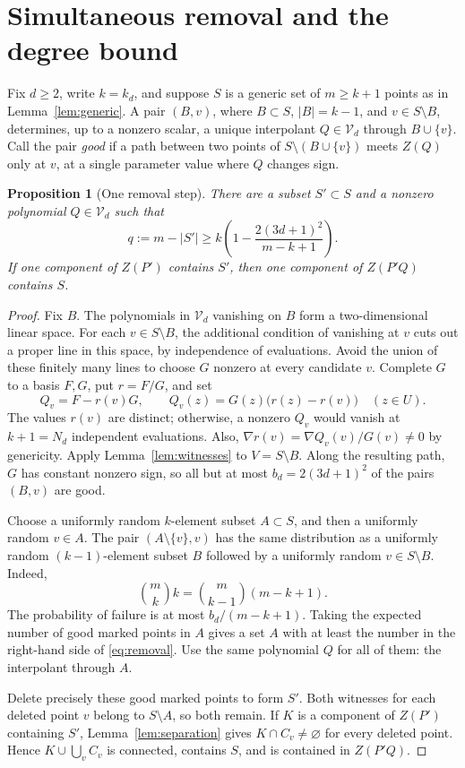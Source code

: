 \documentclass[11pt,letterpaper]{article}
\newcommand{\Vd}{\mathcal V_d}
\newtheorem{proposition}[theorem]{Proposition}
\begin{document}
\section{Simultaneous removal and the degree bound}\label{sec:removal}
Fix $d\geq2$, write $k=k_d$, and suppose $S$ is a generic set of $m\geq k+1$ points as in Lemma~\ref{lem:generic}. A pair $(B,v)$, where $B\subset S$, $|B|=k-1$, and $v\in S\setminus B$, determines, up to a nonzero scalar, a unique interpolant $Q\in\Vd$ through $B\cup\{v\}$. Call the pair \emph{good} if a path between two points of $S\setminus(B\cup\{v\})$ meets $Z(Q)$ only at $v$, at a single parameter value where $Q$ changes sign.
\begin{samepage}
\begin{proposition}[One removal step]\label{prop:removal}
There are a subset $S'\subset S$ and a nonzero polynomial $Q\in\Vd$ such that
\begin{equation}\label{eq:removal}
q:=m-|S'|\geq k\left(1-\frac{2(3d+1)^2}{m-k+1}\right).
\end{equation}
If one component of $Z(P')$ contains $S'$, then one component of $Z(P'Q)$ contains $S$.
\end{proposition}
\end{samepage}
\begin{proof}
Fix $B$. The polynomials in $\Vd$ vanishing on $B$ form a two-dimensional linear space. For each $v\in S\setminus B$, the additional condition of vanishing at $v$ cuts out a proper line in this space, by independence of evaluations. Avoid the union of these finitely many lines to choose $G$ nonzero at every candidate $v$. Complete $G$ to a basis $F,G$, put $r=F/G$, and set
\[
Q_v=F-r(v)G,\qquad Q_v(z)=G(z)\bigl(r(z)-r(v)\bigr)\quad(z\in U).
\]
The values $r(v)$ are distinct; otherwise, a nonzero $Q_v$ would vanish at $k+1=N_d$ independent evaluations. Also, $\nabla r(v)=\nabla Q_v(v)/G(v)\neq0$ by genericity. Apply Lemma~\ref{lem:witnesses} to $V=S\setminus B$. Along the resulting path, $G$ has constant nonzero sign, so all but at most $b_d=2(3d+1)^2$ of the pairs $(B,v)$ are good.

Choose a uniformly random $k$-element subset $A\subset S$, and then a uniformly random $v\in A$. The pair $(A\setminus\{v\},v)$ has the same distribution as a uniformly random $(k-1)$-element subset $B$ followed by a uniformly random $v\in S\setminus B$. Indeed,
\[
\binom mk k=\binom m{k-1}(m-k+1).
\]
The probability of failure is at most $b_d/(m-k+1)$. Taking the expected number of good marked points in $A$ gives a set $A$ with at least the number in the right-hand side of \eqref{eq:removal}. Use the same polynomial $Q$ for all of them: the interpolant through $A$.

Delete precisely these good marked points to form $S'$. Both witnesses for each deleted point $v$ belong to $S\setminus A$, so both remain. If $K$ is a component of $Z(P')$ containing $S'$, Lemma~\ref{lem:separation} gives $K\cap C_v\neq\varnothing$ for every deleted point. Hence $K\cup\bigcup_v C_v$ is connected, contains $S$, and is contained in $Z(P'Q)$.
\end{proof}
\end{document}

